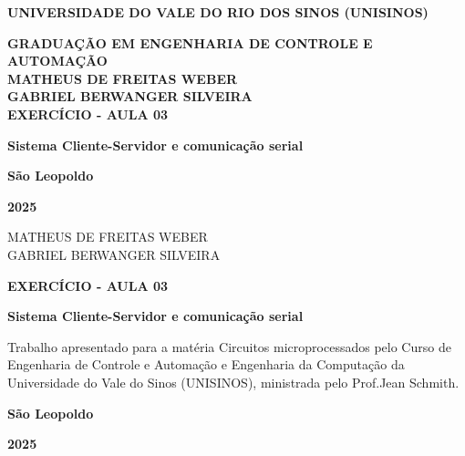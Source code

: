 \documentclass[12pt, a4paper]{article}
\date{\today}
\newcommand\studentName{Matheus de Freitas Weber}
\newcommand\studentTwoName{Gabriel Berwanger Silveira}
\newcommand\courseName{Circuitos microprocessados}
\newcommand\titleName{Exercício - Aula 03}
\newcommand\subTitleName{Sistema Cliente-Servidor e comunicação serial}
\newcommand\teacherName{Jean Schmith}
\begin{document}
\begin{center}
	\MakeUppercase{\textbf{Universidade do Vale do Rio dos Sinos (Unisinos)}}

	\MakeUppercase{\textbf{Graduação em Engenharia de controle e automação}} \\[16ex]


	\MakeUppercase{\textbf{\studentName}}
	\\
	\MakeUppercase{\textbf{\studentTwoName}}
	\\[16ex]

	\MakeUppercase{\textbf{\titleName}}

	\textbf{\subTitleName}

	\vfill

	\textbf{São Leopoldo}

	\textbf{2025}

	\thispagestyle{empty}
\end{center}
\newpage

\begin{center}
	\vspace*{28ex}
	\MakeUppercase{\studentName}
	\\
	\MakeUppercase{\studentTwoName}
	\vspace*{16ex}

	\MakeUppercase{\textbf{\titleName}}

	\textbf{\subTitleName}

	\vspace*{8ex}

	\hfill\begin{minipage}{0.5\linewidth}
		Trabalho apresentado para a matéria {\courseName} pelo Curso de Engenharia de Controle e Automação e Engenharia da Computação da Universidade do Vale do Sinos (UNISINOS), ministrada pelo Prof.\teacherName.
	\end{minipage}
	\vfill

	\textbf{São Leopoldo}

	\textbf{2025}

\end{center}
\thispagestyle{empty}
\setcounter{page}{1}
\newpage

\begin{center}
	\tableofcontents
\end{center}
\thispagestyle{empty}
\newpage

\end{document}
